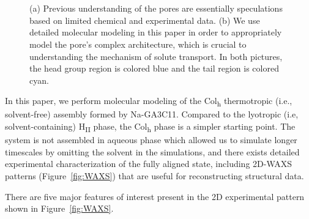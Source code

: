 \documentclass[journal=jpcbfk,manuscript=article]{achemso}
\begin{document}
\begin{figure}[!htb]
\begin{subfigure}{0.45\linewidth}
		\caption{}~\label{fig:detailed_pore}
	\end{subfigure}
    \caption{(a) Previous understanding of the pores are essentially speculations 
    based on limited chemical and experimental data. (b) We use detailed molecular 
    modeling in this paper in order to appropriately model the pore's complex architecture,
    which is crucial to understanding the mechanism of solute transport. In both 
    pictures, the head group region is colored blue and the tail region is colored cyan.}~\label{fig:detail}
  \end{figure}
 
  In this paper, we perform molecular modeling of the Col\textsubscript{h}
  thermotropic (i.e., solvent-free) assembly formed by Na-GA3C11. Compared to 
  the lyotropic (i.e, solvent-containing) H\textsubscript{II} phase, the
  Col\textsubscript{h} phase is a simpler starting point. The system is not
  assembled in aqueous phase which allowed us to simulate longer timescales
  by omitting the solvent in the simulations,
  and there exists detailed experimental characterization of the fully aligned state,
  including 2D-WAXS patterns (Figure~\ref{fig:WAXS}) that are useful for 
  reconstructing structural data. 
  
  
  There are five major features of interest present in the 2D experimental
  pattern shown in Figure~\ref{fig:WAXS}.
\end{document}
